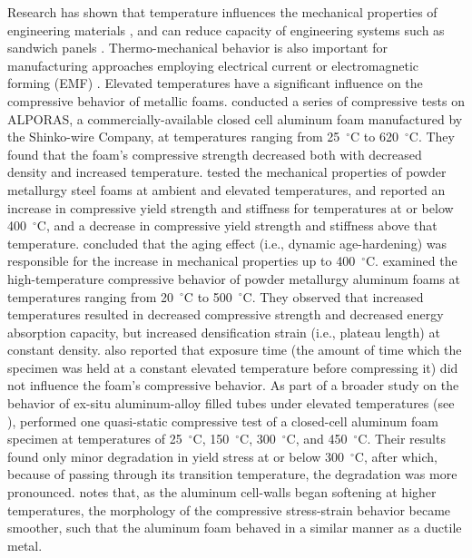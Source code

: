 \documentclass[review]{elsarticle}
\begin{document}
Research has shown that temperature influences the mechanical properties of engineering materials \cite{richeton_influence_2006}, and can reduce capacity of engineering systems such as sandwich panels \cite{zhang_mode_2020}. Thermo-mechanical behavior is also important for manufacturing approaches employing electrical current or electromagnetic forming (EMF) \cite{thomas_theory_2007}. Elevated temperatures have a significant influence on the compressive behavior of metallic foams. \cite{Aly2007} conducted a series of compressive tests on ALPORAS, a commercially-available closed cell aluminum foam manufactured by the Shinko-wire Company, at temperatures ranging from 25~$^\circ\mathrm{C}$ to 620~$^\circ\mathrm{C}$. They found that the foam's compressive strength decreased both with decreased density and increased temperature. \cite{BekozOktay2014} tested the mechanical properties of powder metallurgy steel foams at ambient and elevated temperatures, and reported an increase in compressive yield strength and stiffness for temperatures at or below 400~$^\circ\mathrm{C}$, and a decrease in compressive yield strength and stiffness above that temperature. \cite{BekozOktay2014} concluded that the aging effect (i.e., dynamic age-hardening) was responsible for the increase in mechanical properties up to 400~$^\circ\mathrm{C}$. \cite{Kovacicetal2016} examined the high-temperature compressive behavior of powder metallurgy aluminum foams at temperatures ranging from 20~$^\circ\mathrm{C}$ to 500~$^\circ\mathrm{C}$. They observed that increased temperatures resulted in decreased compressive strength and decreased energy absorption capacity, but increased densification strain (i.e., plateau length) at constant density. \cite{Kovacicetal2016} also reported that exposure time (the amount of time which the specimen was held at a constant elevated temperature before compressing it) did not influence the foam's compressive behavior. As part of a broader study on the behavior of ex-situ aluminum-alloy filled tubes under elevated temperatures (see \cite{Movahedi:2017}), \cite{Linul:2017} performed one quasi-static compressive test of a closed-cell aluminum foam specimen at temperatures of 25~$^\circ\mathrm{C}$, 150~$^\circ\mathrm{C}$, 300~$^\circ\mathrm{C}$, and 450~$^\circ\mathrm{C}$. Their results found only minor degradation in yield stress at or below 300~$^\circ\mathrm{C}$, after which, because of passing through its transition temperature, the degradation was more pronounced. \cite{Linul:2017} notes that, as the aluminum cell-walls began softening at higher temperatures, the morphology of the compressive stress-strain behavior became smoother, such that the aluminum foam behaved in a similar manner as a ductile metal.
\end{document}
